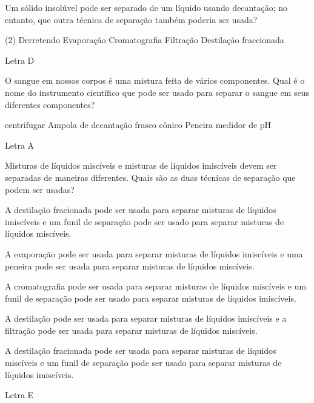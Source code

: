 \documentclass[11pt]{article}
\begin{document}
\begin{exercise}
Um sólido insolúvel pode ser separado de um líquido usando decantação; no entanto, que outra técnica de separação também poderia ser usada?

\begin{choice}(2)
\choice Derretendo
\choice Evaporação
\choice Cromatografia
\choice Filtração
\choice Destilação fraccionada
\end{choice}
\end{exercise}
\begin{solution}
Letra D
\end{solution}



\begin{exercise}
O sangue em nossos corpos é uma mistura feita de vários componentes. Qual é o nome do instrumento científico que pode ser usado para separar o sangue em seus diferentes componentes?

\begin{choice}
\choice centrifugar
\choice Ampola de decantação
\choice frasco cônico
\choice Peneira
\choice medidor de pH
\end{choice}
\end{exercise}
\begin{solution}
Letra A
\end{solution}




\begin{exercise}
Misturas de líquidos miscíveis e misturas de líquidos imiscíveis devem ser separadas de maneiras diferentes. Quais são as duas técnicas de separação que podem ser usadas?

\begin{choice}
\choice A destilação fracionada pode ser usada para separar misturas de líquidos imiscíveis e um funil de separação pode ser usado para separar misturas de líquidos miscíveis.

\choice A evaporação pode ser usada para separar misturas de líquidos imiscíveis e uma peneira pode ser usada para separar misturas de líquidos miscíveis.

\choice A cromatografia pode ser usada para separar misturas de líquidos miscíveis e um funil de separação pode ser usado para separar misturas de líquidos imiscíveis.

\choice A destilação pode ser usada para separar misturas de líquidos imiscíveis e a filtração pode ser usada para separar misturas de líquidos miscíveis.

\choice A destilação fracionada pode ser usada para separar misturas de líquidos miscíveis e um funil de separação pode ser usado para separar misturas de líquidos imiscíveis.
\end{choice}
\end{exercise}
\begin{solution}
Letra E
\end{solution}
\end{document}
